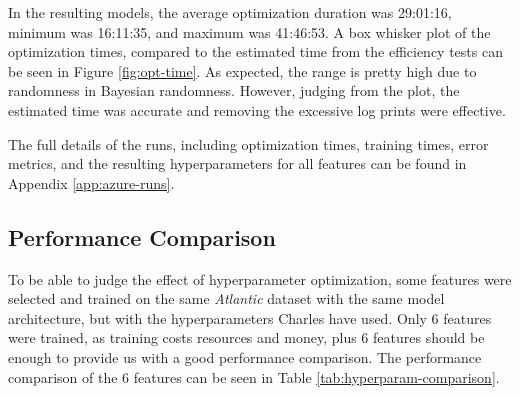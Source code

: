 \documentclass[12pt,twoside]{report}
\begin{document}
In the resulting models, the average optimization duration was 29:01:16, minimum was 16:11:35, and maximum was 41:46:53. A box whisker plot of the optimization times, compared to the estimated time from the efficiency tests can be seen in Figure \ref{fig:opt-time}. As expected, the range is pretty high due to randomness in Bayesian randomness. However, judging from the plot, the estimated time was accurate and removing the excessive log prints were effective.

The full details of the runs, including optimization times, training times, error metrics, and the resulting hyperparameters for all features can be found in Appendix \ref{app:azure-runs}.

\subsection{Performance Comparison}

To be able to judge the effect of hyperparameter optimization, some features were selected and trained on the same \textit{Atlantic} dataset with the same model architecture, but with the hyperparameters Charles have used. Only 6 features were trained, as training costs resources and money, plus 6 features should be enough to provide us with a good performance comparison. The performance comparison of the 6 features can be seen in Table \ref{tab:hyperparam-comparison}.
\end{document}

